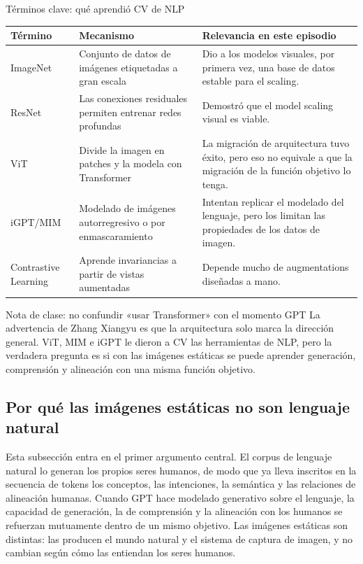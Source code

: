 \documentclass[a4paper]{article}
\begin{document}
\begin{knowledgebox}{Términos clave: qué aprendió CV de NLP}
\noindent\begin{tabularx}{\textwidth}{p{}p{}X}
\toprule
Término & Mecanismo & Relevancia en este episodio \\
\midrule
ImageNet & Conjunto de datos de imágenes etiquetadas a gran escala & Dio a los modelos visuales, por primera vez, una base de datos estable para el scaling. \\
ResNet & Las conexiones residuales permiten entrenar redes profundas & Demostró que el model scaling visual es viable. \\
ViT & Divide la imagen en patches y la modela con Transformer & La migración de arquitectura tuvo éxito, pero eso no equivale a que la migración de la función objetivo lo tenga. \\
iGPT/MIM & Modelado de imágenes autorregresivo o por enmascaramiento & Intentan replicar el modelado del lenguaje, pero los limitan las propiedades de los datos de imagen. \\
Contrastive Learning & Aprende invariancias a partir de vistas aumentadas & Depende mucho de augmentations diseñadas a mano. \\
\bottomrule
\end{tabularx}
\end{knowledgebox}

\begin{warningbox}{Nota de clase: no confundir «usar Transformer» con el momento GPT}
La advertencia de Zhang Xiangyu es que la arquitectura solo marca la dirección general. ViT, MIM e iGPT le dieron a CV las herramientas de NLP, pero la verdadera pregunta es si con las imágenes estáticas se puede aprender generación, comprensión y alineación con una misma función objetivo.
\end{warningbox}

\subsection{Por qué las imágenes estáticas no son lenguaje natural}

Esta subsección entra en el primer argumento central. El corpus de lenguaje natural lo generan los propios seres humanos, de modo que ya lleva inscritos en la secuencia de tokens los conceptos, las intenciones, la semántica y las relaciones de alineación humanas. Cuando GPT hace modelado generativo sobre el lenguaje, la capacidad de generación, la de comprensión y la alineación con los humanos se refuerzan mutuamente dentro de un mismo objetivo. Las imágenes estáticas son distintas: las producen el mundo natural y el sistema de captura de imagen, y no cambian según cómo las entiendan los seres humanos.
\end{document}
